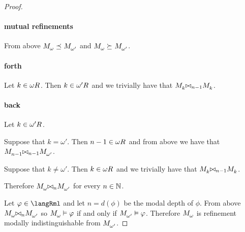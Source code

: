 \begin{proof}
\begin{enumerate}
    \paragraph{mutual refinements}

    From above $\kPModel{\omega} \refines \kPModel{\omega'}$ and  $\kPModel{\omega} \simulates \kPModel{\omega'}$.

    \paragraph{forth}

    Let $k \in \kSuccessors{}{\omega}$.
    Then $k \in \kSuccessors{}{\omega'}$ and we trivially have that $\kPModel{k} \bisimref[n - 1] \kPModel{k}$.

    \paragraph{back}

    Let $k \in \kSuccessors{}{\omega'}$.

    Suppose that $k = \omega'$.
    Then $n - 1 \in \kSuccessors{}{\omega}$ and from above we have that $\kPModel{n - 1} \bisimref[n - 1] \kPModel{\omega'}$.

    Suppose that $k \neq \omega'$.
    Then $k \in \kSuccessors{}{\omega}$ and we trivially have that $\kPModel{k} \bisimref[n - 1] \kPModel{k}$.
\end{enumerate}

Therefore $\kPModel{\omega} \bisimref[n] \kPModel{\omega'}$ for every $n \in \mathbb{N}$.

Let $\phi \in \langRml$ and let $n = d(\phi)$ be the modal depth of $\phi$.
From above $\kPModel{\omega} \bisimref[n] \kPModel{\omega'}$ so $\kPModel{\omega} \entails \phi$ if and only if $\kPModel{\omega'} \entails \phi$.
Therefore $\kPModel{\omega}$ is refinement modally indistinguishable from $\kPModel{\omega'}$.


\end{proof}
